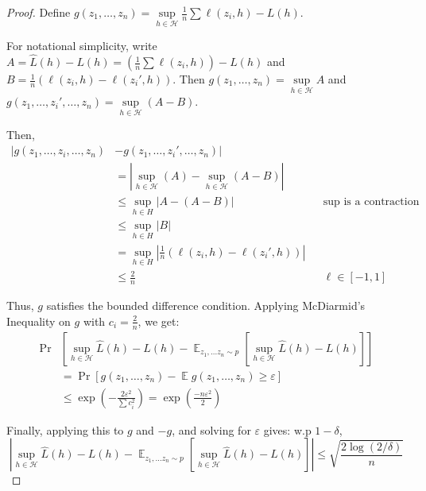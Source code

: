 \documentclass[11pt]{article}
\DeclareMathOperator*{\E}{\mathbb{E}}
\begin{document}
\begin{proof}
Define $g(z_1,\ldots,z_n) = \sup\limits_{h\in\mathcal{H}} \frac{1}{n}\sum \ell(z_i,h) - L(h)$.

For notational simplicity, write
$A = \hat{L}(h) - L(h) = \left(\frac{1}{n}\sum \ell(z_i,h)\right) - L(h)$
and $B = \frac{1}{n}(\ell(z_i,h)- \ell(z_i',h))$.
Then $g(z_1,\ldots,z_n) = \sup\limits_{h\in\mathcal{H}}A$
and $g(z_1,\ldots,z_i',\ldots,z_n) = \sup\limits_{h\in\mathcal{H}}(A-B)$.

Then,
\begin{align*}
    |g(z_1,\ldots,z_i,\ldots,z_n) 
    &- g(z_1,\ldots,z_i',\ldots,z_n)| \\
    &= 
    \left| \sup\limits_{h\in\mathcal{H}} (A) - \sup\limits_{h\in\mathcal{H}} (A-B) \right| \\
    & \le    \sup_{h\in H}\left|    A-(A-B)    \right|  && \text{$\sup$ is a contraction} \\
    & \le \sup_{h\in H}|B| \\
    &= \sup_{h\in H}\left|\frac{1}{n}(\ell(z_i,h)- \ell(z_i',h))\right| \\
    & \le \frac{2}{n} && \text{$\ell \in [-1,1]$}
\end{align*}

Thus, $g$ satisfies the bounded difference condition.
Applying McDiarmid's Inequality on $g$ with $c_i = \frac{2}{n}$, we get:
\begin{align*}
\Pr&\left[\sup\limits_{h\in\mathcal{H}} \hat{L}(h) - L(h)  - \E_{z_1,...z_n \sim p}\left[\sup\limits_{h\in\mathcal{H}} \hat{L}(h) - L(h)\right] \right] \\
&= 
\Pr\left[g(z_1,\ldots,z_n) - \E g(z_1,\ldots,z_n) \ge \varepsilon\right] \\
& \le \exp\left(-\frac{2\varepsilon^2}{\sum c_i^2}\right)
= \exp\left(\frac{-n\varepsilon^2}{2}\right)
\end{align*}

Finally, applying this to $g$ and $-g$, and solving for $\varepsilon$ gives: w.p $1-\delta$,
$$\left|\sup\limits_{h\in\mathcal{H}} \hat{L}(h) - L(h) - \E_{z_1,...z_n \sim p}\left[\sup\limits_{h\in\mathcal{H}} \hat{L}(h) - L(h)\right] \right|
\le \sqrt{\frac{2\log(2/\delta)}{n}}
$$

\end{proof}
\end{document}
